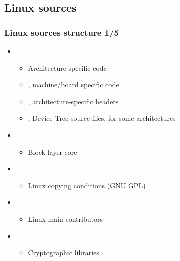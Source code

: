 \subsection{Linux sources}

\begin{frame}
  \frametitle{Linux sources structure 1/5}
  \begin{itemize}
  \item {}
    \begin{itemize}
    \item Architecture specific code
    \item {}, machine/board
      specific code
    \item {}, architecture-specific
      headers
    \item {}, Device Tree source files, for
      some architectures
    \end{itemize}
  \item {}
    \begin{itemize}
    \item Block layer core
    \end{itemize}
  \item {}
    \begin{itemize}
    \item Linux copying conditions (GNU GPL)
    \end{itemize}
  \item {}
    \begin{itemize}
    \item Linux main contributors
    \end{itemize}
  \item {}
    \begin{itemize}
    \item Cryptographic libraries
    \end{itemize}
  \end{itemize}
\end{frame}

